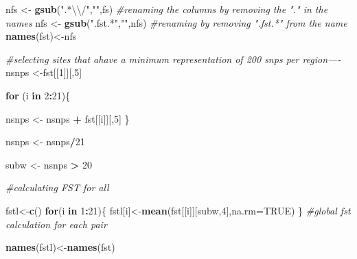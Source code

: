 \documentclass[]{article}
\newenvironment{Shaded}{\begin{snugshade}}{\end{snugshade}}
\newcommand{\KeywordTok}[1]{\textcolor[rgb]{0.13,0.29,0.53}{\textbf{#1}}}
\newcommand{\DataTypeTok}[1]{\textcolor[rgb]{0.13,0.29,0.53}{#1}}
\newcommand{\DecValTok}[1]{\textcolor[rgb]{0.00,0.00,0.81}{#1}}
\newcommand{\CharTok}[1]{\textcolor[rgb]{0.31,0.60,0.02}{#1}}
\newcommand{\StringTok}[1]{\textcolor[rgb]{0.31,0.60,0.02}{#1}}
\newcommand{\CommentTok}[1]{\textcolor[rgb]{0.56,0.35,0.01}{\textit{#1}}}
\newcommand{\OtherTok}[1]{\textcolor[rgb]{0.56,0.35,0.01}{#1}}
\newcommand{\ControlFlowTok}[1]{\textcolor[rgb]{0.13,0.29,0.53}{\textbf{#1}}}
\newcommand{\OperatorTok}[1]{\textcolor[rgb]{0.81,0.36,0.00}{\textbf{#1}}}
\newcommand{\NormalTok}[1]{#1}
\begin{document}
\begin{Shaded}
\begin{Highlighting}[]
\NormalTok{nfs <-}\StringTok{ }\KeywordTok{gsub}\NormalTok{(}\StringTok{".*}\CharTok{\textbackslash{}\textbackslash{}}\StringTok{/"}\NormalTok{,}\StringTok{""}\NormalTok{,fs) }\CommentTok{#renaming the columns by removing the "." in the names}
\NormalTok{nfs <-}\StringTok{ }\KeywordTok{gsub}\NormalTok{(}\StringTok{".fst.*"}\NormalTok{,}\StringTok{""}\NormalTok{,nfs) }\CommentTok{#renaming by removing ".fst.*" from the name}
\KeywordTok{names}\NormalTok{(fst)<-nfs}

\CommentTok{#selecting sites that ahave a minimum representation of 200 snps per region----}
\NormalTok{nsnps <-fst[[}\DecValTok{1}\NormalTok{]][,}\DecValTok{5}\NormalTok{]}

\ControlFlowTok{for}\NormalTok{ (i }\ControlFlowTok{in} \DecValTok{2}\OperatorTok{:}\DecValTok{21}\NormalTok{)\{}
  
\NormalTok{  nsnps <-}\StringTok{ }\NormalTok{nsnps }\OperatorTok{+}\StringTok{ }\NormalTok{fst[[i]][,}\DecValTok{5}\NormalTok{]}
\NormalTok{\}}

\NormalTok{nsnps <-}\StringTok{ }\NormalTok{nsnps}\OperatorTok{/}\DecValTok{21}

\NormalTok{subw <-}\StringTok{ }\NormalTok{nsnps }\OperatorTok{>}\StringTok{ }\DecValTok{20}

\CommentTok{#calculating FST for all}

\NormalTok{fstl<-}\KeywordTok{c}\NormalTok{()}
\ControlFlowTok{for}\NormalTok{(i }\ControlFlowTok{in} \DecValTok{1}\OperatorTok{:}\DecValTok{21}\NormalTok{)\{}
\NormalTok{  fstl[i]<-}\KeywordTok{mean}\NormalTok{(fst[[i]][subw,}\DecValTok{4}\NormalTok{],}\DataTypeTok{na.rm=}\OtherTok{TRUE}\NormalTok{)}
\NormalTok{\} }\CommentTok{#global fst calculation for each pair}

\KeywordTok{names}\NormalTok{(fstl)<-}\KeywordTok{names}\NormalTok{(fst)}


\end{Highlighting}
\end{Shaded}
\end{document}
